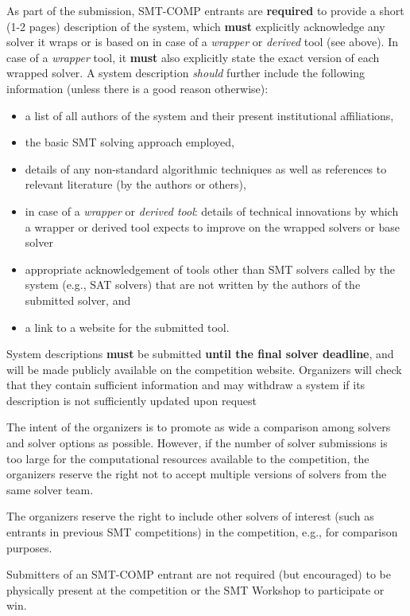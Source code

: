 \documentclass[12pt]{article}
\begin{document}
%
As part of the submission, SMT-COMP entrants are \textbf{required} to provide a
short (1-2 pages) description of the system, which \textbf{must} explicitly
acknowledge any solver it wraps or is based on in case of a \emph{wrapper} or
\emph{derived} tool (see above).
In case of a \emph{wrapper} tool, it \textbf{must} also explicitly state
the exact version of each wrapped solver.
A system description \emph{should} further include the following information
(unless there is a good reason otherwise):
\begin{itemize}[itemsep=0ex]
  \item a list of all authors of the system and their present institutional
    affiliations,
  \item the basic SMT solving approach employed,
  \item details of any non-standard algorithmic techniques as well as
    references to relevant literature (by the authors or others),
  \item in case of a \emph{wrapper} or \emph{derived tool}: details of
    technical innovations by which a wrapper or derived tool expects to improve
    on the wrapped solvers or base solver
  \item appropriate acknowledgement of tools other than SMT solvers called by
    the system (e.g., SAT solvers) that are not written by the authors of the
    submitted solver, and
  \item a link to a website for the submitted tool.
\end{itemize}
System descriptions \textbf{must} be submitted \textbf{until the final solver
deadline}, and will be made publicly available on the competition website.
Organizers will check that they contain sufficient information
and may withdraw a system if its description is not sufficiently updated upon
request

%
The intent of the organizers is to promote as wide a comparison among
solvers and solver options as possible.  However, if the number of
solver submissions is too large for the computational resources
available to the competition, the organizers reserve the right not to
accept multiple versions of solvers from the same solver team.

%
The organizers reserve the right to include other solvers of interest
(such as entrants in previous SMT competitions) in the competition,
e.g., for comparison purposes.

%
Submitters of an SMT-COMP entrant are not required (but encouraged) to be
physically present at the competition or the SMT Workshop to participate or
win.
\end{document}
